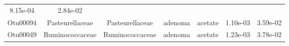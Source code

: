 \documentclass[11pt,]{article}
\begin{document}
\begin{longtable}[]{@{}ccccccc@{}}
\begin{minipage}[t]{0.09\columnwidth}
8.15e-04\strut
\end{minipage} & \begin{minipage}[t]{0.09\columnwidth}\centering\strut
2.84e-02\strut
\end{minipage}\tabularnewline
\begin{minipage}[t]{0.09\columnwidth}\centering\strut
Otu00094\strut
\end{minipage} & \begin{minipage}[t]{0.17\columnwidth}\centering\strut
Pasteurellaceae\strut
\end{minipage} & \begin{minipage}[t]{0.17\columnwidth}\centering\strut
Pasteurellaceae\strut
\end{minipage} & \begin{minipage}[t]{0.09\columnwidth}\centering\strut
adenoma\strut
\end{minipage} & \begin{minipage}[t]{0.11\columnwidth}\centering\strut
acetate\strut
\end{minipage} & \begin{minipage}[t]{0.09\columnwidth}\centering\strut
1.10e-03\strut
\end{minipage} & \begin{minipage}[t]{0.09\columnwidth}\centering\strut
3.59e-02\strut
\end{minipage}\tabularnewline
\begin{minipage}[t]{0.09\columnwidth}\centering\strut
Otu00049\strut
\end{minipage} & \begin{minipage}[t]{0.17\columnwidth}\centering\strut
Ruminococcaceae\strut
\end{minipage} & \begin{minipage}[t]{0.17\columnwidth}\centering\strut
Ruminococcaceae\strut
\end{minipage} & \begin{minipage}[t]{0.09\columnwidth}\centering\strut
adenoma\strut
\end{minipage} & \begin{minipage}[t]{0.11\columnwidth}\centering\strut
acetate\strut
\end{minipage} & \begin{minipage}[t]{0.09\columnwidth}\centering\strut
1.23e-03\strut
\end{minipage} & \begin{minipage}[t]{0.09\columnwidth}\centering\strut
3.78e-02\strut
\end{minipage}\tabularnewline

\end{longtable}
\end{document}
